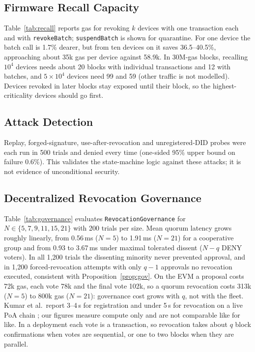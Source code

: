 \subsection{Firmware Recall Capacity}\label{sec:recall_eval}
Table~\ref{tab:recall} reports gas for revoking $k$ devices with one transaction each and with \texttt{revokeBatch}; \texttt{suspendBatch} is shown for quarantine. For one device the batch call is 1.7\% dearer, but from ten devices on it saves 36.5--40.5\%, approaching about 35k gas per device against 58.9k. In 30M-gas blocks, recalling $10^4$ devices needs about 20 blocks with individual transactions and 12 with batches, and $5\times10^4$ devices need 99 and 59 (other traffic is not modelled). Devices revoked in later blocks stay exposed until their block, so the highest-criticality devices should go first.

\begin{table}[t]
\centering
\caption{Gas for recalling devices: per-device transactions versus batch revocation}
\label{tab:recall}
\scriptsize

\par\smallskip{}
\end{table}

\subsection{Attack Detection}\label{sec:attacks}
Replay, forged-signature, use-after-revocation and unregistered-DID probes were each run in 500 trials and denied every time (one-sided 95\% upper bound on failure 0.6\%). This validates the state-machine logic against these attacks; it is not evidence of unconditional security.

\subsection{Decentralized Revocation Governance}\label{sec:governance_eval}
Table~\ref{tab:governance} evaluates \texttt{RevocationGovernance} for $N\in\{5,7,9,11,15,21\}$ with 200 trials per size. Mean quorum latency grows roughly linearly, from 0.56\,ms ($N=5$) to 1.91\,ms ($N=21$) for a cooperative group and from 0.93 to 3.67\,ms under maximal tolerated dissent ($N-q$ DENY voters). In all 1{,}200 trials the dissenting minority never prevented approval, and in 1{,}200 forced-revocation attempts with only $q-1$ approvals no revocation executed, consistent with Proposition~\ref{prop:gov}. On the EVM a proposal costs 72k gas, each vote 78k and the final vote 102k, so a quorum revocation costs 313k ($N=5$) to 800k gas ($N=21$): governance cost grows with $q$, not with the fleet. Kumar et al.\ report 3--4\,s for registration and under 5\,s for revocation on a live PoA chain \cite{kumar2026privacy}; our figures measure compute only and are not comparable like for like. In a deployment each vote is a transaction, so revocation takes about $q$ block confirmations when votes are sequential, or one to two blocks when they are parallel.

